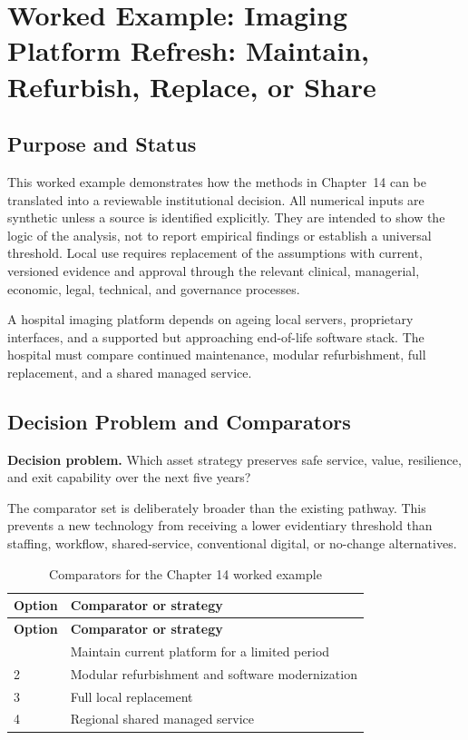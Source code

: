 \section{Worked Example: Imaging Platform Refresh: Maintain, Refurbish, Replace, or Share}
\label{sec:comp-ch14-worked-example}

\subsection{Purpose and Status}
This worked example demonstrates how the methods in Chapter~14 can be
translated into a reviewable institutional decision. All numerical inputs are
synthetic unless a source is identified explicitly. They are intended to show the
logic of the analysis, not to report empirical findings or establish a universal
threshold. Local use requires replacement of the assumptions with current,
versioned evidence and approval through the relevant clinical, managerial,
economic, legal, technical, and governance processes.

A hospital imaging platform depends on ageing local servers, proprietary interfaces, and a supported but approaching end-of-life software stack. The hospital must compare continued maintenance, modular refurbishment, full replacement, and a shared managed service. 

\subsection{Decision Problem and Comparators}
\textbf{Decision problem.} Which asset strategy preserves safe service, value, resilience, and exit capability over the next five years?

The comparator set is deliberately broader than the existing pathway. This prevents
a new technology from receiving a lower evidentiary threshold than staffing,
workflow, shared-service, conventional digital, or no-change alternatives.

\begin{longtable}{@{}p{}p{}@{}}
\caption{Comparators for the Chapter 14 worked example}
\label{tab:comp-ch14-comparators}\\
\toprule
\textbf{Option} & \textbf{Comparator or strategy} \\
\midrule
\endfirsthead
\toprule
\textbf{Option} & \textbf{Comparator or strategy} \\
\midrule
\endhead
\bottomrule
\endlastfoot
1 & Maintain current platform for a limited period \\
2 & Modular refurbishment and software modernization \\
3 & Full local replacement \\
4 & Regional shared managed service \\
\end{longtable}

